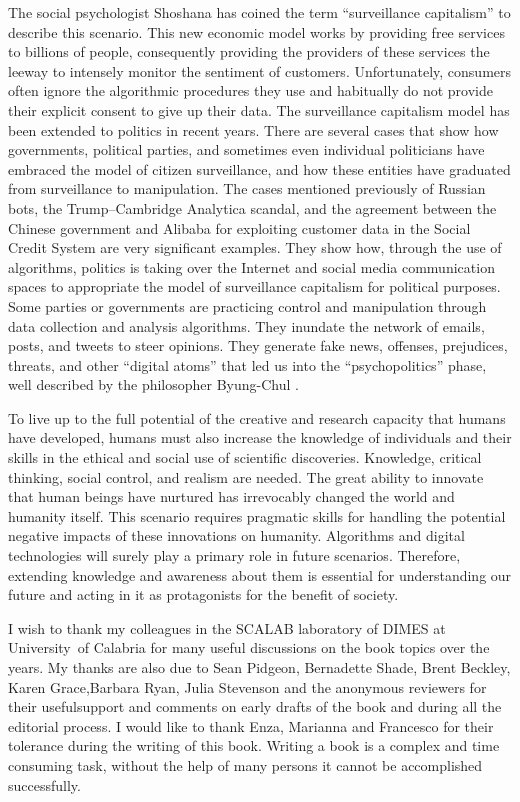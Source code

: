 The social psychologist Shoshana \citet{chap:prolog:Zuboff:2019} has coined the term ``surveillance capitalism'' to describe this scenario. This new economic model works by providing free services to billions of people, consequently providing the providers of these services the leeway to intensely monitor the sentiment of customers. Unfortunately, consumers often ignore the algorithmic procedures they use and habitually do not provide their explicit consent to give up their data. The surveillance capitalism model has been extended to politics in recent years. There are \hbox{several} cases that show how governments, political parties, and sometimes even individual politicians have embraced the model of citizen surveillance, and how these entities have graduated from surveillance to manipulation. The cases mentioned previously of Russian bots, the Trump--Cambridge Analytica scandal, and the agreement between the Chinese government and Alibaba for exploiting \hbox{customer} data in the Social Credit System are very significant examples. They show how, through the use of algorithms, politics is taking over the Internet and social media communication spaces to appropriate the model of surveillance capitalism for political purposes. Some parties or governments are practicing control and manipulation through data collection and analysis algorithms. They inundate the network of emails, posts, and tweets to steer opinions. They generate fake news, offenses, prejudices, threats, and other ``digital atoms'' that led us into the ``psychopolitics'' phase, well described by the philosopher Byung-Chul \citet{chap:prolog:Han:2017}.

To live up to the full potential of the creative and research capacity that humans have developed, humans must also increase the knowledge of individuals and their skills in the ethical and social use of scientific discoveries. Knowledge, critical thinking, social control, and realism are needed. The great ability to innovate that human beings have nurtured has irrevocably changed the world and humanity itself. This scenario requires pragmatic skills for handling the potential negative impacts of these innovations on humanity. Algorithms and digital technologies will surely play a primary role in future scenarios. Therefore, extending knowledge and awareness about them is essential for understanding our future and acting in it as protagonists for the benefit of society.


I wish to thank my colleagues in the SCALAB laboratory of DIMES at \hbox{University of} Calabria for many useful discussions on the book topics over the years. My thanks are also due to Sean Pidgeon, Bernadette Shade, Brent Beckley, Karen Grace,\break Barbara Ryan, Julia Stevenson and the anonymous reviewers for their useful\break support and comments on early drafts of the book and during all the editorial process. I would like to thank Enza, Marianna and Francesco for their tolerance during the writing of this book. Writing a book is a complex and time consuming task, without the help of many persons it cannot be accomplished successfully.

